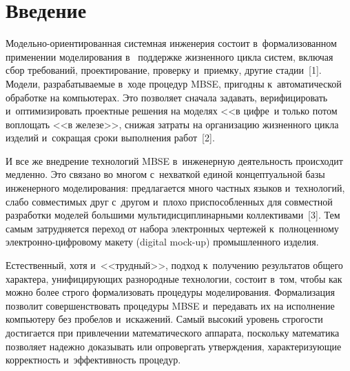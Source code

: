 \thispagestyle{headings}

\begin{multicols}{2}

\label{st\stat}

\section{Введение}

   Модельно-ориентированная системная инженерия состоит в~формализованном применении моделирования в~
поддержке жизненного цикла сис\-тем, включая сбор требований, 
проектирование, проверку и~приемку, другие стадии~[1]. Модели, 
разрабатываемые в~ходе процедур MBSE, пригодны к~автоматической 
обработке на компьютерах. Это позволяет сначала задавать, верифицировать 
и~оптимизировать проектные решения на моделях <<в циф\-ре~и только потом 
воплощать <<в железе>>, снижая затраты на организацию жизненного цикла 
изделий и~сокращая сроки выполнения работ~[2].
   
   И все же внедрение технологий MBSE в~инженерную деятельность 
происходит медленно. Это связано во многом с~нехваткой единой 
концептуальной базы инженерного моделирования: предлагается много 
частных языков и~технологий, слабо совместимых друг с~другом и~плохо 
приспособленных для совместной разработки моделей большими 
мультидисциплинарными коллективами~[3]. Тем самым затрудняется переход 
от набора электронных чертежей к~полноценному электронно-цифровому 
макету (digital mock-up) промышленного изделия.
   
   Естественный, хотя и~<<трудный>>, подход к~получению результатов 
общего характера, унифи\-ци\-ру\-ющих разнородные технологии, состоит в~том, 
чтобы как можно более строго формализовать процедуры моделирования. 
Формализация позволит совершенствовать процедуры MBSE и~передавать их 
на исполнение компьютеру без пробелов и~искажений. Самый высокий уровень 
строгости достигается при привлечении математического аппарата, поскольку 
математика позволяет надежно доказывать или опровергать утверждения, 
ха\-рак\-те\-ри\-зу\-ющие корректность и~эффективность процедур.
   

\end{multicols}

